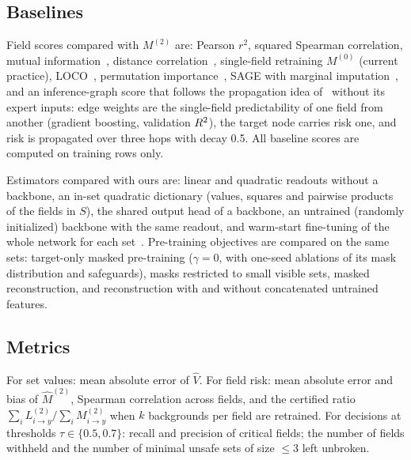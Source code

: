 \subsection{Baselines}
Field scores compared with $M^{(2)}$ are: Pearson $r^2$, squared Spearman correlation, mutual
information~\cite{kraskov2004mi}, distance correlation~\cite{szekely2007dcor}, single-field
retraining $M^{(0)}$ (current practice), LOCO~\cite{lei2018loco}, permutation
importance~\cite{breiman2001rf}, SAGE with marginal imputation~\cite{covert2020sage}, and an
inference-graph score that follows the propagation idea of~\cite{hu2026ignn} without its expert
inputs: edge weights are the single-field predictability of one field from another (gradient
boosting, validation $R^{2}$), the target node carries risk one, and risk is propagated over three
hops with decay 0.5. All baseline scores are computed on training rows only.

Estimators compared with ours are: linear and quadratic readouts without a backbone, an in-set
quadratic dictionary (values, squares and pairwise products of the fields in $S$), the shared
output head of a backbone, an untrained (randomly initialized) backbone with the same
readout, and warm-start fine-tuning of the whole network for each set~\cite{sun2025warmstart}. Pre-training
objectives are compared on the same sets: target-only masked pre-training ($\gamma=0$, with one-seed ablations of its
mask distribution and safeguards), masks restricted to small visible sets, masked reconstruction, and reconstruction
with and without concatenated untrained features.

\subsection{Metrics}
For set values: mean absolute error of $\hat V$. For field risk: mean absolute error and bias of
$\hat M^{(2)}$, Spearman correlation across fields, and the certified ratio
$\sum_i L^{(2)}_{i\to y}/\sum_i M^{(2)}_{i\to y}$ when $k$ backgrounds per field are retrained.
For decisions at thresholds $\tau\in\{0.5,0.7\}$: recall and precision of critical fields; the
number of fields withheld and the number of minimal unsafe sets of size $\le 3$ left unbroken.
